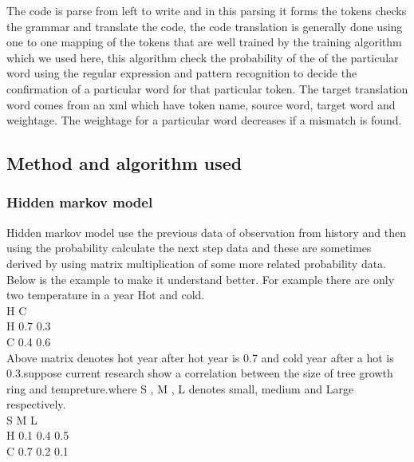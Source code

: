 \documentclass[23pt]{article}
\begin{document}
{\Large The code is parse from left to write and in this parsing it forms the tokens checks the grammar and translate the code, the code translation is generally done using one to one mapping of the tokens that are well trained by the training algorithm which we used here, this algorithm check the probability of the of the particular word using the regular expression and pattern recognition to decide the confirmation of a particular word for that particular token. The target translation word comes from an xml which have token name, source word, target word and weightage. The weightage for a particular word decreases if a mismatch is found. \\ \par}

\subsection{Method and algorithm used }

\subsubsection{Hidden markov model}

{\Large Hidden markov model use the previous data of observation from history and then using the probability calculate the next step data and these are sometimes derived by using matrix multiplication of some more related probability data. Below is the example to make it understand better. For example there are only two temperature in a year Hot and cold. \\ 
                       \thinspace  H     C \\
                              H   0.7  0.3 \\
                              C  0.4 0.6   \\

Above matrix denotes hot year after hot year is 0.7 and cold year after a hot is 0.3.suppose current research show a correlation between the size of tree growth ring and tempreture.where S , M , L denotes small, medium and Large respectively. \\

                            \thinspace          S     M    L \\
                               H  0.1  0.4  0.5 \\
                               C  0.7  0.2  0.1 
\\   \par}
\end{document}
